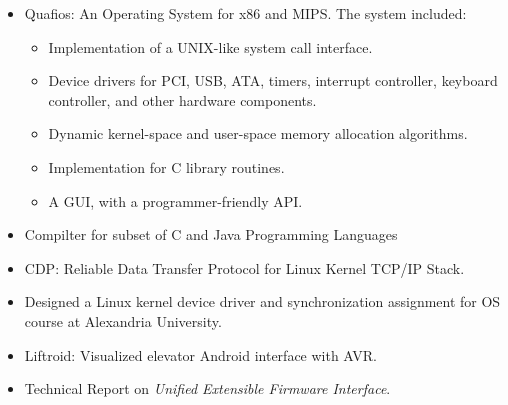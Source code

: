 \documentclass[letterpaper]{twentysecondcv} %
\begin{document}
\begin{itemize}
    \item{Quafios: An Operating System for x86 and MIPS. The system included:
          \begin{itemize}
            \item Implementation of a UNIX-like system call interface.
            \item Device drivers for PCI, USB, ATA, timers, interrupt controller, 
                  keyboard controller, and other hardware components.
            \item Dynamic kernel-space and user-space memory allocation algorithms.
            \item Implementation for C library routines.
            \item A GUI, with a programmer-friendly API.
          \end{itemize}
          }
    \item{Compilter for subset of C and Java Programming Languages}
    \item{CDP: Reliable Data Transfer Protocol for Linux Kernel TCP/IP Stack.}
    \item{Designed a Linux kernel device driver and synchronization assignment 
          for OS course at Alexandria University.}
    \item{Liftroid: Visualized elevator Android interface with AVR.}
    \item{Technical Report on \textit{Unified Extensible Firmware Interface}.}
\end{itemize}
\end{document}

